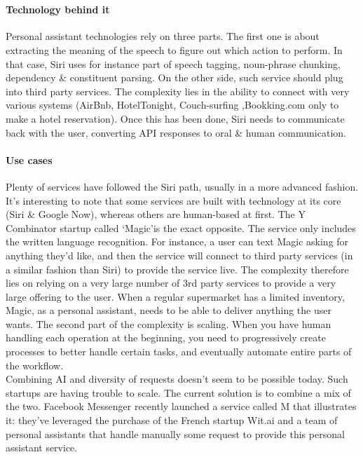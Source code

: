 \documentclass[12pt]{article}
\begin{document}
\\

\paragraph{Technology behind it}
Personal assistant technologies rely on three parts.
The first one is about extracting the meaning of the speech to figure out which
action to perform. In that case, Siri uses for instance part of speech tagging,
noun-phrase chunking, dependency \& constituent parsing. On the other side,
such service should plug into third party services. The complexity lies in the
ability to connect with very various systems (AirBnb, HotelTonight, Couch-surfing
,Bookking.com only to make a hotel reservation). Once this has been done, Siri
needs to communicate back with the user, converting API responses to oral \&
human communication.

\paragraph{Use cases}

Plenty of services have followed the Siri path, usually in a more advanced
fashion. It's interesting to note that some services are built with technology
at its core (Siri \& Google Now), whereas others are human-based at first. The Y
Combinator startup called \lq Magic\rq  is the exact opposite. The service only
includes the written language recognition. For instance, a user can text Magic
asking for anything they'd like, and then the service will connect to third
party services (in a similar fashion than Siri) to provide the service live. The
complexity therefore lies on relying on a very large number of 3rd party
services to provide a very large offering to the user. When a regular supermarket
has a limited inventory, Magic, as a personal assistant, needs to be able to
deliver anything the user wants. The second part of the complexity is scaling.
When you have human handling each operation at the beginning, you need to
progressively create processes to better handle certain tasks, and eventually
automate entire parts of the workflow.\\

Combining AI and diversity of requests doesn't seem to be possible today. Such
startups are having trouble to scale. The current solution is to combine a mix
of the two. Facebook Messenger recently launched a service called M that
illustrates it: they've leveraged the purchase of the French startup Wit.ai and
a team of personal assistants that handle manually some request to provide this
personal assistant service.\\
\end{document}
